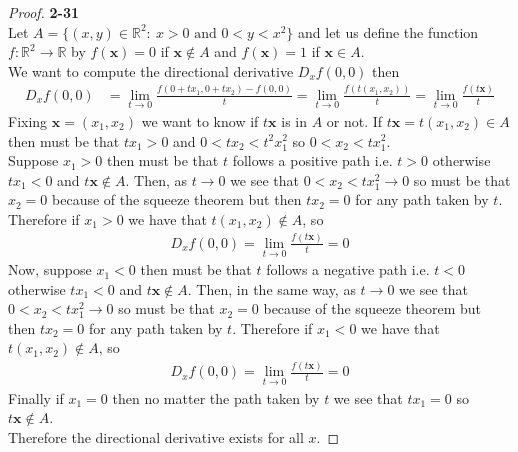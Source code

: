 \documentclass[11pt]{article}
\newcommand{\R}{\mathbb{R}}
\theoremstyle{definition}
\begin{document}
\cleardoublepage
\begin{proof}{\textbf{2-31}}\\
Let $A = \{(x,y)\in \R^2:~x>0 \text{ and } 0< y < x^2\}$ and let us define the
function $f: \R^2 \to \R$ by $f(\bm{x}) = 0$ if $\bm{x} \not\in A$ and $f(\bm{x}) = 1$ if
$\bm{x} \in A$.
\\
We want to compute the directional derivative $D_xf(0,0)$ then 
\begin{align*}
    D_xf(0,0) &= \lim_{t\to 0} \frac{f(0 + tx_1, 0 + tx_2) - f(0,0)}{t}
    = \lim_{t\to 0} \frac{f(t(x_1, x_2))}{t}
    = \lim_{t\to 0} \frac{f(t\bm{x})}{t}
\end{align*}
Fixing $\bm{x} = (x_1, x_2)$ we want to know if $t\bm{x}$ is in $A$ or not.
If $t\bm{x} = t(x_1, x_2) \in A$ then must be that $tx_1 > 0$ and
$0 < tx_2 < t^2x_1^2$ so $0 < x_2 < tx_1^2$.\\
Suppose $x_1 > 0$ then must be that $t$ follows a positive path i.e. $t > 0$
otherwise $tx_1 < 0$ and $t\bm{x} \not\in A$. Then, as $t\to 0$ we see that
$0 < x_2 < tx_1^2 \to 0$ so must be that $x_2 = 0$ because of the squeeze
theorem but then $tx_2 = 0$ for any path taken by $t$.
Therefore if $x_1 > 0$ we have that $t(x_1, x_2) \not\in A$, so
\begin{align*}
    D_xf(0,0) = \lim_{t\to 0} \frac{f(t\bm{x})}{t} = 0
\end{align*}
Now, suppose $x_1 < 0$ then must be that $t$ follows a negative path i.e.
$t < 0$ otherwise $tx_1 < 0$ and $t\bm{x} \not\in A$.
Then, in the same way, as $t\to 0$ we see that
$0 < x_2 < tx_1^2 \to 0$ so must be that $x_2 = 0$ because of the squeeze
theorem but then $tx_2 = 0$ for any path taken by $t$.
Therefore if $x_1 < 0$ we have that $t(x_1, x_2) \not\in A$, so
\begin{align*}
    D_xf(0,0) = \lim_{t\to 0} \frac{f(t\bm{x})}{t} = 0
\end{align*}
Finally if $x_1 = 0$ then no matter the path taken by $t$ we see that
$tx_1 = 0$ so $t\bm{x} \not\in A$.
\\
Therefore the directional derivative exists for all $x$.
\end{proof}
\end{document}
